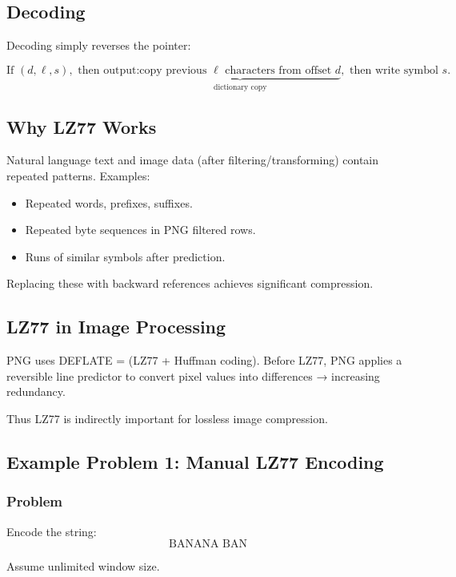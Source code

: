 \documentclass{AnantDocumentation}
\begin{document}
\subsection{Decoding}

Decoding simply reverses the pointer:

\[
\text{If } (d,\ell,s), \text{ then output:}
\underbrace{\text{copy previous }\ell\text{ characters from offset } d}_{\text{dictionary copy}}, 
\text{ then write symbol } s.
\]

\subsection{Why LZ77 Works}

Natural language text and image data (after filtering/transforming) contain repeated patterns. Examples:

\begin{itemize}
\item Repeated words, prefixes, suffixes.
\item Repeated byte sequences in PNG filtered rows.
\item Runs of similar symbols after prediction.
\end{itemize}

Replacing these with backward references achieves significant compression.

\subsection{LZ77 in Image Processing}

PNG uses DEFLATE = (LZ77 + Huffman coding).  
Before LZ77, PNG applies a reversible line predictor to convert pixel values into differences → increasing redundancy.

Thus LZ77 is indirectly important for lossless image compression.

\subsection{Example Problem 1: Manual LZ77 Encoding}

\subsubsection*{Problem}

Encode the string:
\[
\text{BANANA BAN}
\]

Assume unlimited window size.
\end{document}
